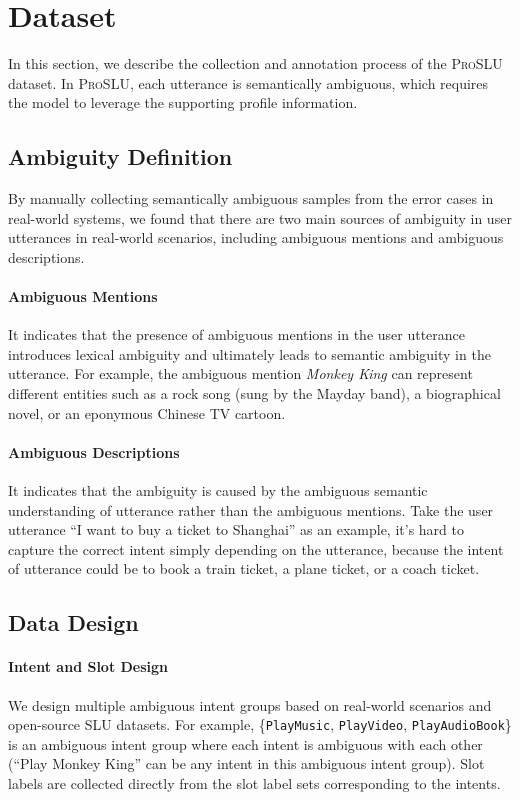 \documentclass[letterpaper]{article} \usepackage{aaai22}  \usepackage{times}  \usepackage{helvet}  \usepackage{courier}  \usepackage[hyphens]{url}  \usepackage{graphicx} \urlstyle{rm} \def\UrlFont{\rm}  \usepackage{natbib}  \usepackage{caption} \DeclareCaptionStyle{ruled}{labelfont=normalfont,labelsep=colon,strut=off} \frenchspacing  \setlength{\pdfpagewidth}{8.5in}  \setlength{\pdfpageheight}{11in}  \usepackage{algorithm}
\begin{document}
 \section{Dataset}
\label{Dataset}
In this section, we describe the collection and annotation process of the \textsc{ProSLU} dataset. 
In \textsc{ProSLU}, each utterance is semantically ambiguous, which requires the model to leverage the supporting profile information.
\subsection{Ambiguity Definition}
\label{sec:definition-Ambiguity}
By manually collecting semantically ambiguous samples from the error cases in real-world systems, we found that
there are two main sources of ambiguity in user utterances in real-world scenarios, including ambiguous mentions and ambiguous descriptions.
\paragraph{Ambiguous Mentions}
It indicates that the presence of ambiguous mentions in the user utterance introduces lexical ambiguity and ultimately leads to semantic ambiguity in the utterance.
For example, the ambiguous mention \textit{Monkey King} can represent different entities such as a rock song (sung by the Mayday band), a biographical novel, or an eponymous Chinese TV cartoon.

\paragraph{Ambiguous Descriptions} 
It indicates that the ambiguity is caused by the ambiguous semantic understanding of utterance rather than the ambiguous mentions.
Take the user utterance ``I want to buy a ticket to Shanghai'' as an example, it's hard to capture the correct intent simply depending on the utterance, because the intent of utterance could be to book a train ticket, a plane ticket, or a coach ticket.

\subsection{Data Design}
\paragraph{Intent and Slot Design}
We design multiple ambiguous intent groups based on real-world scenarios and open-source SLU datasets.
For example, \{\texttt{PlayMusic}, \texttt{PlayVideo}, \texttt{PlayAudioBook}\} is an ambiguous intent group where each intent is ambiguous with each other (``Play Monkey King'' can be any intent in this ambiguous intent group).
Slot labels are collected directly from the slot label sets corresponding to the intents.
\end{document}
